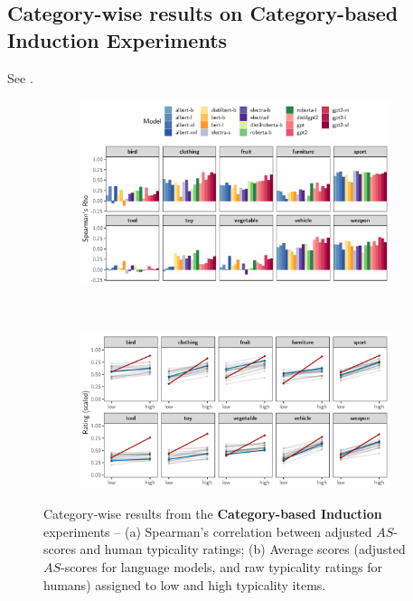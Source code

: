 \documentclass[a4paper, 11pt]{article}
\begin{document}
\subsection{Category-wise results on Category-based Induction Experiments}

See .

\begin{figure}[h]
    \centering
    \begin{subfigure}[b]{\textwidth}
        \includegraphics[width = \textwidth]{../paper/induction_categorywise.pdf}
        \caption{}
    \end{subfigure}\\
    \vspace{1em}
    \begin{subfigure}[b]{\textwidth}
        \includegraphics[width = \textwidth]{../paper/inductioncategorywiselowhigh.pdf}
        \caption{}
    \end{subfigure}
    \caption{Category-wise results from the \textbf{Category-based Induction} experiments -- (a) Spearman's correlation between adjusted $AS$-scores and human typicality ratings; (b) Average scores (adjusted $AS$-scores for language models, and raw typicality ratings for humans) assigned to low and high typicality items.}
    \label{fig:cbicategory}
\end{figure}





\end{document}
